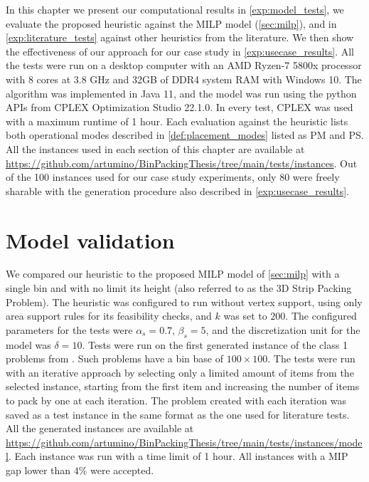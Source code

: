 In this chapter we present our computational results in \cref{exp:model_tests}, we evaluate the proposed heuristic against the MILP model (\cref{sec:milp}), and in \cref{exp:literature_tests} against other heuristics from the literature. We then show the effectiveness of our approach for our case study in \cref{exp:usecase_results}.
All the tests were run on a desktop computer with an AMD Ryzen-7 5800x processor with 8 cores at 3.8 GHz and 32GB of DDR4 system RAM with Windows 10. The algorithm was implemented in Java 11, and the model was run using the python APIs from CPLEX Optimization Studio 22.1.0.
In every test, CPLEX was used with a maximum runtime of 1 hour.
Each evaluation against the heuristic lists both operational modes described in \cref{def:placement_modes} listed as PM and PS.
All the instances used in each section of this chapter are available at \url{https://github.com/artumino/BinPackingThesis/tree/main/tests/instances}.
Out of the 100 instances used for our case study experiments, only 80 were freely sharable with the generation procedure also described in \cref{exp:usecase_results}.

\section{Model validation}
We compared our heuristic to the proposed MILP model of \cref{sec:milp} with a single bin and with no limit its height (also referred to as the 3D Strip Packing Problem).
The heuristic was configured to run without vertex support, using only area support rules for its feasibility checks, and $k$ was set to $200$.
The configured parameters for the tests were $\alpha_s = 0.7$, $\beta_s = 5$, and the discretization unit for the model was $\delta = 10$.
Tests were run on the first generated instance of the class 1 problems from \cite{martello2000three}. Such problems have a bin base of $100 \times 100$.
The tests were run with an iterative approach by selecting only a limited amount of items from the selected instance, starting from the first item and increasing the number of items to pack by one at each iteration.
The problem created with each iteration was saved as a test instance in the same format as the one used for literature tests.
All the generated instances are available at \url{https://github.com/artumino/BinPackingThesis/tree/main/tests/instances/model}.
Each instance was run with a time limit of 1 hour. All instances with a MIP gap lower than $4\%$ were accepted.

